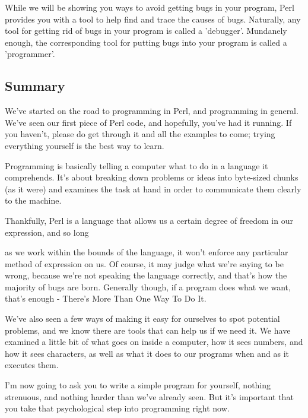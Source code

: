 \documentclass[a4paper,11pt]{book}
\begin{document}
\noindent While we will be showing you ways to avoid getting bugs in your program, Perl provides you with a tool to help find and trace the causes of bugs. Naturally, any tool for getting rid of bugs in your program is called a 'debugger'. Mundanely enough, the corresponding tool for putting bugs into your program is called a 'programmer'.

\noindent 

\noindent 

\subsection{Summary}

\noindent 

\noindent We've started on the road to programming in Perl, and programming in general. We've seen our first piece of Perl code, and hopefully, you've had it running. If you haven't, please do get through it and all the examples to come; trying everything yourself is the best way to learn.

\noindent 

\noindent Programming is basically telling a computer what to do in a language it comprehends. It's about breaking down problems or ideas into byte-sized chunks (as it were) and examines the task at hand in order to communicate them clearly to the machine.

\noindent 

\noindent Thankfully, Perl is a language that allows us a certain degree of freedom in our expression, and so long

\noindent as we work within the bounds of the language, it won't enforce any particular method of expression on us. Of course, it may judge what we're saying to be wrong, because we're not speaking the language correctly, and that's how the majority of bugs are born. Generally though, if a program does what we want, that's enough - There's More Than One Way To Do It.

\noindent 

\noindent We've also seen a few ways of making it easy for ourselves to spot potential problems, and we know there are tools that can help us if we need it. We have examined a little bit of what goes on inside a computer, how it sees numbers, and how it sees characters, as well as what it does to our programs when and as it executes them.

\noindent 

\noindent I'm now going to ask you to write a simple program for yourself, nothing strenuous, and nothing harder than we've already seen. But it's important that you take that psychological step into programming right now.
\end{document}
